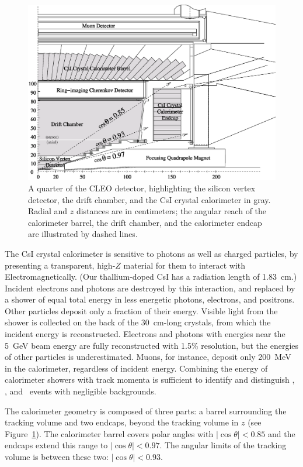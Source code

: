 \documentclass{cornell}
\begin{document}
\begin{figure}
  \begin{center}
    \includegraphics[width=0.7\linewidth]{quarterview}
  \end{center}
  \caption[Quarter-view of the CLEO detector]{\label{quarterview} A
  quarter of the CLEO detector, highlighting the silicon vertex
  detector, the drift chamber, and the CsI crystal calorimeter in
  gray.  Radial and $z$ distances are in centimeters; the angular
  reach of the calorimeter barrel, the drift chamber, and the
  calorimeter endcap are illustrated by dashed lines.}
\end{figure}

The CsI crystal calorimeter is sensitive to photons as well as charged
particles, by presenting a transparent, high-$Z$ material for them to
interact with Electromagnetically.  (Our thallium-doped CsI has a
radiation length of 1.83~cm.)  Incident electrons and photons are
destroyed by this interaction, and replaced by a shower of equal total
energy in less energetic photons, electrons, and positrons.  Other
particles deposit only a fraction of their energy.  Visible light from
the shower is collected on the back of the 30~cm-long crystals, from
which the incident energy is reconstructed.  Electrons and photons
with energies near the 5~GeV beam energy are fully reconstructed with
1.5\% resolution, but the energies of other particles is
underestimated.  Muons, for instance, deposit only 200~MeV in the
calorimeter, regardless of incident energy.  Combining the energy of
calorimeter showers with track momenta is sufficient to identify and
distinguish \ee, \mumu, and \gamgam\ events with negligible
backgrounds.

The calorimeter geometry is composed of three parts: a barrel
surrounding the tracking volume and two endcaps, beyond the tracking
volume in $z$ (see Figure~\ref{quarterview}).  The calorimeter barrel
covers polar angles with $|\cos\theta| < 0.85$ and the endcaps extend
this range to $|\cos\theta| < 0.97$.  The angular limits of the
tracking volume is between these two: $|\cos\theta| < 0.93$.
\end{document}
